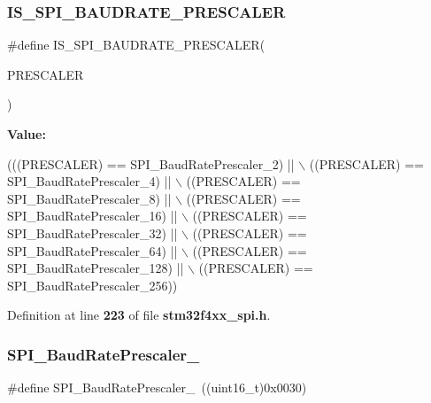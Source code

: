 \subsubsection{I\+S\+\_\+\+S\+P\+I\+\_\+\+B\+A\+U\+D\+R\+A\+T\+E\+\_\+\+P\+R\+E\+S\+C\+A\+L\+ER}
{\footnotesize\ttfamily \#define I\+S\+\_\+\+S\+P\+I\+\_\+\+B\+A\+U\+D\+R\+A\+T\+E\+\_\+\+P\+R\+E\+S\+C\+A\+L\+ER(\begin{DoxyParamCaption}\item[{}]{P\+R\+E\+S\+C\+A\+L\+ER }\end{DoxyParamCaption})}

{\bfseries Value\+:}
\begin{DoxyCode}
(((PRESCALER) == SPI_BaudRatePrescaler_2) || \(\backslash\)
                                              ((PRESCALER) == 
      SPI_BaudRatePrescaler_4) || \(\backslash\)
                                              ((PRESCALER) == 
      SPI_BaudRatePrescaler_8) || \(\backslash\)
                                              ((PRESCALER) == 
      SPI_BaudRatePrescaler_16) || \(\backslash\)
                                              ((PRESCALER) == 
      SPI_BaudRatePrescaler_32) || \(\backslash\)
                                              ((PRESCALER) == 
      SPI_BaudRatePrescaler_64) || \(\backslash\)
                                              ((PRESCALER) == 
      SPI_BaudRatePrescaler_128) || \(\backslash\)
                                              ((PRESCALER) == 
      SPI_BaudRatePrescaler_256))
\end{DoxyCode}


Definition at line \textbf{ 223} of file \textbf{ stm32f4xx\+\_\+spi.\+h}.

\mbox{\label{group__SPI__BaudRate__Prescaler_gafa6c39c3ee16a08730356a5cd30f3648}} 
\subsubsection{S\+P\+I\+\_\+\+Baud\+Rate\+Prescaler\+\_}
{\footnotesize\ttfamily \#define S\+P\+I\+\_\+\+Baud\+Rate\+Prescaler\+\_~((uint16\+\_\+t)0x0030)}



